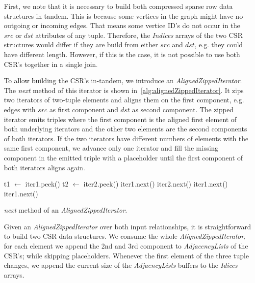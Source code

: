 First, we note that it is necessary to build both compressed sparse row data structures in tandem.
This is because some vertices in the graph might have no outgoing or incoming edges.
That means some vertice ID's do not occur in the $src$ or $dst$ attributes of any tuple.
Therefore, the \textit{Indices} arrays of the two CSR structures would differ if they are build from either $src$ and $dst$, e.g.
they could have different length.
However, if this is the case, it is not possible to use both CSR's together in a single join.

To allow building the CSR's in-tandem, we introduce an \textit{AlignedZippedIterator}.
The \textit{next} method of this iterator is shown in~\cref{alg:alignedZippedIterator}.
It zips two iterators of two-tuple elements and aligns them on the first component, e.g. edges with $src$ as first component and $dst$ as
second component.
The zipped iterator emits triples where the first component is the aligned first element of both underlying iterators and the other
two elements are the second components of both iterators.
If the two iterators have different numbers of elements with the same first component, we advance only one iterator and fill the missing
component in the emitted triple with a placeholder until the first component of both iterators aligns again.

\begin{algorithm}
   {
    t1 $\leftarrow$ iter1.peek() \;
    t2 $\leftarrow$ iter2.peek() \;
     {
      iter1.next()\;
      iter2.next()\;
      \;
    }  {
      iter1.next()\;
       \;
    } 
  }  {
    iter1.next() \;
     \;
  } 
  \caption{\textit{next} method of an \textit{AlignedZippedIterator}.}
  \label{alg:alignedZippedIterator}
\end{algorithm}

Given an \textit{AlignedZippedIterator} over both input relationships, it is straightforward to build two CSR data structures.
We consume the whole \textit{AlignedZippedIterator}, for each element we append the 2nd and 3rd component to \textit{AdjacencyLists} of
the CSR's;
while skipping placeholders.
Whenever the first element of the three tuple changes, we append the current size of the \textit{AdjaencyLists} buffers to the
\textit{Idices} arrays.

